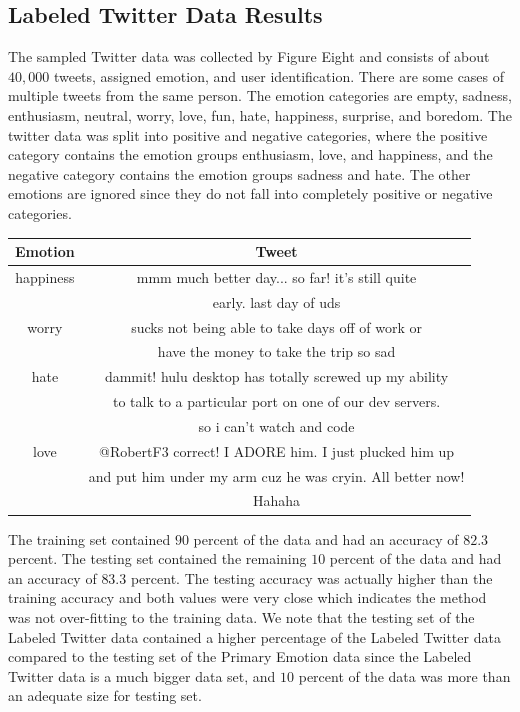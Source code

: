 \documentclass[titlepage,letterpaper]{article}
\begin{document}
\subsection{Labeled Twitter Data Results}

The sampled Twitter data was collected by Figure Eight \cite{LabeledTwitter} and consists of about $40,000$ tweets, assigned emotion, and user identification. There are some cases of multiple tweets from the same person. The emotion categories are empty, sadness, enthusiasm, neutral, worry, love, fun, hate, happiness, surprise, and boredom. The twitter data was split into positive and negative categories, where the positive category contains the emotion groups enthusiasm, love, and happiness, and the negative category contains the emotion groups sadness and hate. The other emotions are ignored since they do not fall into completely positive or negative categories. 

 \begin{center}
	\begin{tabular}{ |c|c| } 
		\hline
		Emotion & Tweet \\
		\hline \hline
		happiness & mmm much better day... so far! it's still quite\\
		 & early. last day of uds \\
		\hline
		worry &  sucks not being able to take days off of work or \\
		& have the money to take the trip  so sad \\
		\hline
		hate & dammit! hulu desktop has totally screwed up my ability \\
		& to talk to a particular port on one of our dev servers. \\
		& so i can't watch and code  \\ 
		\hline
		love & @RobertF3 correct! I ADORE him. I just plucked him up \\ 
		& and put him under my arm cuz he was cryin.  All better now! \\ & Hahaha \\
		\hline
	\end{tabular}
	\label{McdonaldsServiceFailureTable}
\end{center}

The training set contained $90$ percent of the data and had an accuracy of $82.3$ percent. The testing set contained the remaining $10$ percent of the data and had an accuracy of $83.3$ percent. The testing accuracy was actually higher than the training accuracy and both values were very close which indicates the method was not over-fitting to the training data. We note that the testing set of the Labeled Twitter data contained a higher percentage of the Labeled Twitter data compared to the testing set of the Primary Emotion data since the Labeled Twitter data is a much bigger data set, and $10$ percent of the data was more than an adequate size for testing set. 
\end{document}

